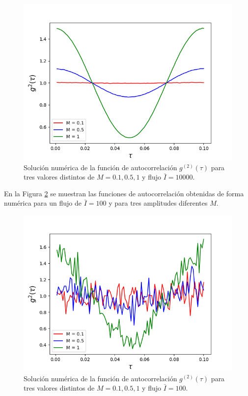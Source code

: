 \documentclass[twoside]{article}
\begin{document}
\begin{multicols}{2}
				\begin{figure}[H]
					\centering
					\includegraphics[scale=0.38]{../Int10000.png}
					\caption{\label{Img:10000}Solución numérica de la función de autocorrelación $g^{(2)}(\tau)$ para tres valores distintos de $M = {0.1, 0.5, 1}$ y flujo $\bar{I} = 10000$.}
				\end{figure}

			En la Figura \ref{Img:100} se muestran las funciones de autocorrelación obtenidas de forma numérica para un flujo de $\bar{I} = 100$ y para tres amplitudes diferentes $M$.

				\begin{figure}[H]
					\centering
					\includegraphics[scale=0.38]{../Int100.png}
					\caption{\label{Img:100}Solución numérica de la función de autocorrelación $g^{(2)}(\tau)$ para tres valores distintos de $M = {0.1, 0.5, 1}$ y flujo $\bar{I} = 100$.}
				\end{figure}


\end{multicols}
\end{document}
